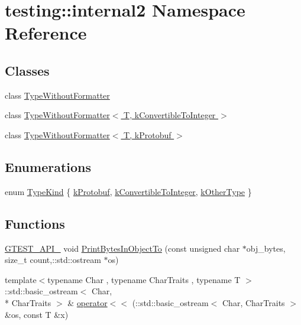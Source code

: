 \hypertarget{namespacetesting_1_1internal2}{\section{testing\+:\+:internal2 Namespace Reference}
\label{namespacetesting_1_1internal2}
}
\subsection*{Classes}
\begin{DoxyCompactItemize}
\item 
class \hyperlink{classtesting_1_1internal2_1_1_type_without_formatter}{Type\+Without\+Formatter}
\item 
class \hyperlink{classtesting_1_1internal2_1_1_type_without_formatter_3_01_t_00_01k_convertible_to_integer_01_4}{Type\+Without\+Formatter$<$ T, k\+Convertible\+To\+Integer $>$}
\item 
class \hyperlink{classtesting_1_1internal2_1_1_type_without_formatter_3_01_t_00_01k_protobuf_01_4}{Type\+Without\+Formatter$<$ T, k\+Protobuf $>$}
\end{DoxyCompactItemize}
\subsection*{Enumerations}
\begin{DoxyCompactItemize}
\item 
enum \hyperlink{namespacetesting_1_1internal2_aeb8161b0b3ee503347b0662d7028fd57}{Type\+Kind} \{ \hyperlink{namespacetesting_1_1internal2_aeb8161b0b3ee503347b0662d7028fd57a14aaf98a2547ecf43eef0868d54b1383}{k\+Protobuf}, 
\hyperlink{namespacetesting_1_1internal2_aeb8161b0b3ee503347b0662d7028fd57a9bdcf3f1548f498b2b7f097306ea0224}{k\+Convertible\+To\+Integer}, 
\hyperlink{namespacetesting_1_1internal2_aeb8161b0b3ee503347b0662d7028fd57abe8aaea44751d6ebd0cdf5bd94451db1}{k\+Other\+Type}
 \}
\end{DoxyCompactItemize}
\subsection*{Functions}
\begin{DoxyCompactItemize}
\item 
\hyperlink{gtest-port_8h_aa73be6f0ba4a7456180a94904ce17790}{G\+T\+E\+S\+T\+\_\+\+A\+P\+I\+\_\+} void \hyperlink{namespacetesting_1_1internal2_a04a384ee5de3a9f4f00a6052ea79b495}{Print\+Bytes\+In\+Object\+To} (const unsigned char $\ast$obj\+\_\+bytes, size\+\_\+t count,\+::std\+::ostream $\ast$os)
\item 
{\footnotesize template$<$typename Char , typename Char\+Traits , typename T $>$ }\\\+::std\+::basic\+\_\+ostream$<$ Char, \\*
Char\+Traits $>$ \& \hyperlink{namespacetesting_1_1internal2_a07dbe129beb8952074f04b599dfce39b}{operator$<$$<$} (\+::std\+::basic\+\_\+ostream$<$ Char, Char\+Traits $>$ \&os, const T \&x)
\end{DoxyCompactItemize}
